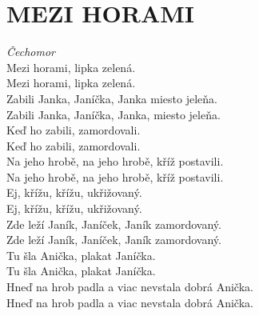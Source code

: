 \section*{\Huge MEZI HORAMI}
\emph{Čechomor}\\


Mezi horami, \hspace{1cm}lipka zelená.\\
Mezi horami, lipka zelená.\\
Zabili Janka, Janíčka, Janka
miesto jele\hspace{0.5cm}ňa.\\
Zabili Janka, Janíčka, Janka, miesto jeleňa.\\

Keď ho zabili, zamordovali.\\
Keď ho zabili, zamordovali.\\
Na jeho hrobě, na jeho hrobě, kříž postavili.\\
Na jeho hrobě, na jeho hrobě, kříž postavili.\\

Ej, křížu, křížu, ukřižovaný.\\
Ej, křížu, křížu, ukřižovaný.\\
Zde leží Janík, Janíček, Janík zamordovaný.\\
Zde leží Janík, Janíček, Janík zamordovaný.\\

Tu šla Anička, plakat Janíčka.\\
Tu šla Anička, plakat Janíčka.\\
Hneď na hrob padla a viac nevstala dobrá Anička.\\
Hneď na hrob padla a viac nevstala dobrá Anička.

\newpage
